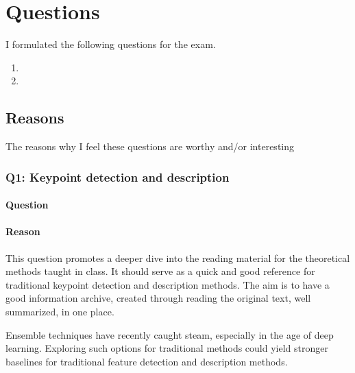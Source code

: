 
\section{Questions}

I formulated the following questions for the exam.

\newcommand{\questionOne}{
    
}

\newcommand{\questionTwo}{
    
}

\begin{enumerate}
    \item \questionOne
    \item \questionTwo
\end{enumerate}

\subsection{Reasons}

The reasons why I feel these questions are worthy and/or interesting

\subsubsection*{Q1: Keypoint detection and description}

\paragraph*{Question}
\begin{displayquote}
    \questionOne
\end{displayquote}

\paragraph*{Reason}
This question promotes a deeper dive into the reading material for the theoretical methods taught in class. It should serve as a quick and good reference for traditional keypoint detection and description methods.
The aim is to have a good information archive, created through reading the original text, well summarized, in one place.

Ensemble techniques have recently caught steam, especially in the age of deep learning. Exploring such options for traditional methods could yield stronger baselines for traditional feature detection and description methods.


